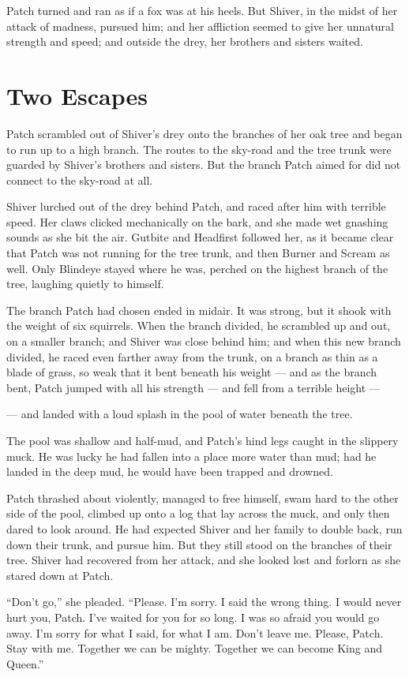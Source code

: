 \documentclass[ebook,oneside,openany,17pt]{memoir}
\renewcommand{\thechapter}{\Roman{chapter}}
\newcounter{sections}
\newcommand{\sections}[1]{%
  \section*{#1}
  \addtocounter{sections}{1}%
  \pdfbookmark[1]{#1}{section.\thechapter.\thesections}}
\begin{document}
Patch turned and ran as if a fox was at his heels. But Shiver, in the
midst of her attack of madness, pursued him; and her affliction seemed
to give her unnatural strength and speed; and outside the drey, her
brothers and sisters waited.


\sections{Two Escapes}

Patch scrambled out of Shiver’s drey onto the branches of her oak tree
and began to run up to a high branch. The routes to the sky-road and
the tree trunk were guarded by Shiver’s brothers and sisters. But the
branch Patch aimed for did not connect to the sky-road at all.

Shiver lurched out of the drey behind Patch, and raced after him with
terrible speed. Her claws clicked mechanically on the bark, and she
made wet gnashing sounds as she bit the air. Gutbite and Headfirst
followed her, as it became clear that Patch was not running for the
tree trunk, and then Burner and Scream as well. Only Blindeye stayed
where he was, perched on the highest branch of the tree, laughing
quietly to himself.

The branch Patch had chosen ended in midair. It was strong, but it
shook with the weight of six squirrels. When the branch divided, he
scrambled up and out, on a smaller branch; and Shiver was close behind
him; and when this new branch divided, he raced even farther away from
the trunk, on a branch as thin as a blade of grass, so weak that it
bent beneath his weight — and as the branch bent, Patch jumped with
all his strength — and fell from a terrible height —

— and landed with a loud splash in the pool of water beneath the tree.

The pool was shallow and half-mud, and Patch’s hind legs caught in the
slippery muck. He was lucky he had fallen into a place more water than
mud; had he landed in the deep mud, he would have been trapped and
drowned.

Patch thrashed about violently, managed to free himself, swam hard to
the other side of the pool, climbed up onto a log that lay across the
muck, and only then dared to look around. He had expected Shiver and
her family to double back, run down their trunk, and pursue him. But
they still stood on the branches of their tree. Shiver had recovered
from her attack, and she looked lost and forlorn as she stared down at
Patch.

“Don’t go,” she pleaded. “Please. I’m sorry. I said the wrong thing. I
would never hurt you, Patch. I’ve waited for you for so long. I was so
afraid you would go away. I’m sorry for what I said, for what I
am. Don’t leave me. Please, Patch. Stay with me. Together we can be
mighty. Together we can become King and Queen.”
\end{document}

